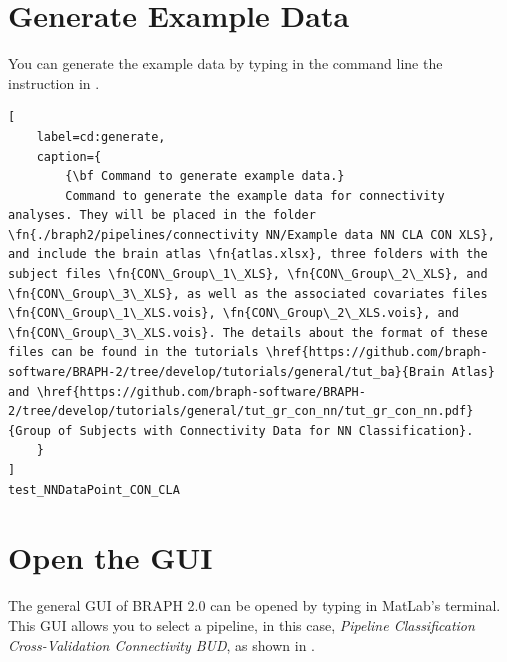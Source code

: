 \documentclass[justified]{tufte-handout}
\begin{document}
	{
	
\tableofcontents

\clearpage
\section{Generate Example Data}

You can generate the example data by typing in the command line the instruction in .
%
\begin{lstlisting}[
	label=cd:generate,
	caption={
		{\bf Command to generate example data.}
		Command to generate the example data for connectivity analyses. They will be placed in the folder \fn{./braph2/pipelines/connectivity NN/Example data NN CLA CON XLS}, and include the brain atlas \fn{atlas.xlsx}, three folders with the subject files \fn{CON\_Group\_1\_XLS}, \fn{CON\_Group\_2\_XLS}, and \fn{CON\_Group\_3\_XLS}, as well as the associated covariates files \fn{CON\_Group\_1\_XLS.vois}, \fn{CON\_Group\_2\_XLS.vois}, and \fn{CON\_Group\_3\_XLS.vois}. The details about the format of these files can be found in the tutorials \href{https://github.com/braph-software/BRAPH-2/tree/develop/tutorials/general/tut_ba}{Brain Atlas} and \href{https://github.com/braph-software/BRAPH-2/tree/develop/tutorials/general/tut_gr_con_nn/tut_gr_con_nn.pdf}{Group of Subjects with Connectivity Data for NN Classification}.
	}
]
test_NNDataPoint_CON_CLA
\end{lstlisting}

\section{Open the GUI}

The general GUI of BRAPH 2.0 can be opened by typing  in MatLab's terminal. This GUI allows you to select a pipeline, in this case, \emph{Pipeline Classification Cross-Validation Connectivity BUD}, as shown in .


}
\end{document}
